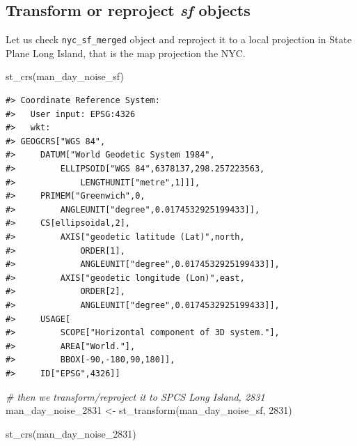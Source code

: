 \documentclass[
  11pt,
]{book}
\newenvironment{Shaded}{\begin{snugshade}}{\end{snugshade}}
\newcommand{\CommentTok}[1]{\textcolor[rgb]{0.56,0.35,0.01}{\textit{#1}}}
\newcommand{\DecValTok}[1]{\textcolor[rgb]{0.00,0.00,0.81}{#1}}
\newcommand{\FunctionTok}[1]{\textcolor[rgb]{0.00,0.00,0.00}{#1}}
\newcommand{\NormalTok}[1]{#1}
\newcommand{\OtherTok}[1]{\textcolor[rgb]{0.56,0.35,0.01}{#1}}
\begin{document}
\hypertarget{transform-or-reproject-sf-objects}{%
\subsection{\texorpdfstring{Transform or reproject \textbf{\emph{sf}} objects}{Transform or reproject sf objects}}\label{transform-or-reproject-sf-objects}}

Let us check \texttt{nyc\_sf\_merged} object and reproject it to a local projection in State Plane Long Island, that is the map projection the NYC.

\begin{Shaded}
\begin{Highlighting}[]
\FunctionTok{st\_crs}\NormalTok{(man\_day\_noise\_sf)}
\end{Highlighting}
\end{Shaded}

\begin{verbatim}
#> Coordinate Reference System:
#>   User input: EPSG:4326 
#>   wkt:
#> GEOGCRS["WGS 84",
#>     DATUM["World Geodetic System 1984",
#>         ELLIPSOID["WGS 84",6378137,298.257223563,
#>             LENGTHUNIT["metre",1]]],
#>     PRIMEM["Greenwich",0,
#>         ANGLEUNIT["degree",0.0174532925199433]],
#>     CS[ellipsoidal,2],
#>         AXIS["geodetic latitude (Lat)",north,
#>             ORDER[1],
#>             ANGLEUNIT["degree",0.0174532925199433]],
#>         AXIS["geodetic longitude (Lon)",east,
#>             ORDER[2],
#>             ANGLEUNIT["degree",0.0174532925199433]],
#>     USAGE[
#>         SCOPE["Horizontal component of 3D system."],
#>         AREA["World."],
#>         BBOX[-90,-180,90,180]],
#>     ID["EPSG",4326]]
\end{verbatim}

\begin{Shaded}
\begin{Highlighting}[]
\CommentTok{\# then we transform/reproject it to SPCS Long Island, 2831}
\NormalTok{man\_day\_noise\_2831 }\OtherTok{\textless{}{-}} \FunctionTok{st\_transform}\NormalTok{(man\_day\_noise\_sf, }\DecValTok{2831}\NormalTok{)}

\FunctionTok{st\_crs}\NormalTok{(man\_day\_noise\_2831)}
\end{Highlighting}
\end{Shaded}
\end{document}
